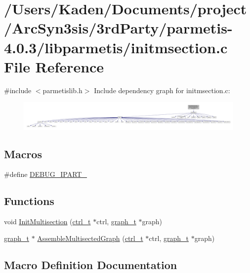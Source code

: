 \hypertarget{a00365}{}\section{/\+Users/\+Kaden/\+Documents/project/\+Arc\+Syn3sis/3rd\+Party/parmetis-\/4.0.3/libparmetis/initmsection.c File Reference}
\label{a00365}
{\ttfamily \#include $<$parmetislib.\+h$>$}\newline
Include dependency graph for initmsection.\+c\+:\nopagebreak
\begin{figure}[H]
\begin{center}
\leavevmode
\includegraphics[width=350pt]{a00366}
\end{center}
\end{figure}
\subsection*{Macros}
\begin{DoxyCompactItemize}
\item 
\#define \hyperlink{a00365_a1492f936447ebd68489d4ca456ffadef}{D\+E\+B\+U\+G\+\_\+\+I\+P\+A\+R\+T\+\_\+}
\end{DoxyCompactItemize}
\subsection*{Functions}
\begin{DoxyCompactItemize}
\item 
void \hyperlink{a00365_ad2642ed6985ca20fc79c0a5b52c5424b}{Init\+Multisection} (\hyperlink{a00742}{ctrl\+\_\+t} $\ast$ctrl, \hyperlink{a00734}{graph\+\_\+t} $\ast$graph)
\item 
\hyperlink{a00734}{graph\+\_\+t} $\ast$ \hyperlink{a00365_aafb75eb581d7dd13903d8e5040dce30a}{Assemble\+Multisected\+Graph} (\hyperlink{a00742}{ctrl\+\_\+t} $\ast$ctrl, \hyperlink{a00734}{graph\+\_\+t} $\ast$graph)
\end{DoxyCompactItemize}


\subsection{Macro Definition Documentation}
\mbox{\label{a00365_a1492f936447ebd68489d4ca456ffadef}} 
